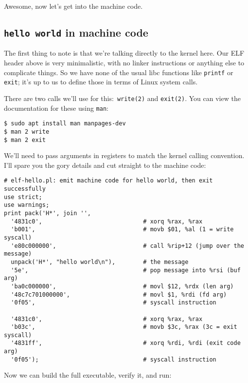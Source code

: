 Awesome, now let's get into the machine code.

\subsection{{\tt hello world} in machine code}
The first thing to note is that we're talking directly to the kernel here. Our
ELF header above is very minimalistic, with no linker instructions or anything
else to complicate things. So we have none of the usual libc functions like
{\tt printf} or {\tt exit}; it's up to us to define those in terms of Linux
system calls.

There are two calls we'll use for this:~{\tt write(2)} and {\tt exit(2)}. You
can view the documentation for these using {\tt man}:

\begin{verbatim}
$ sudo apt install man manpages-dev
$ man 2 write
$ man 2 exit\end{verbatim}

We'll need to pass arguments in registers to match the
    {kernel calling convention}. I'll spare you the gory details and cut
straight to the machine code:

\begin{verbatim}
# elf-hello.pl: emit machine code for hello world, then exit successfully
use strict;
use warnings;
print pack('H*', join '',
  '4831c0',                             # xorq %rax, %rax
  'b001',                               # movb $01, %al (1 = write syscall)
  'e80c000000',                         # call %rip+12 (jump over the message)
  unpack('H*', "hello world\n"),        # the message
  '5e',                                 # pop message into %rsi (buf arg)
  'ba0c000000',                         # movl $12, %rdx (len arg)
  '48c7c701000000',                     # movl $1, %rdi (fd arg)
  '0f05',                               # syscall instruction

  '4831c0',                             # xorq %rax, %rax
  'b03c',                               # movb $3c, %rax (3c = exit syscall)
  '4831ff',                             # xorq %rdi, %rdi (exit code arg)
  '0f05');                              # syscall instruction\end{verbatim}

Now we can build the full executable, verify it, and run:

